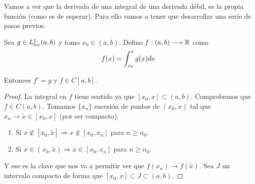 Vamos a ver que la derivada de una integral de una derivada débil, es la propia función (como es de esperar). Para ello vamos a tener que desarrollar una serie de pasos previos.

\begin{prop}
Sea $g\in L^1_{loc}(a,b)$ y tomo $x_0\in(a,b)$. Defino $f : (a,b) \longrightarrow \mathbb{R}$ como
\[
f(x)=\displaystyle\int_{ x_0 }^{ x } g(x)ds
\]

Entonces $f'=g$ y $f\in C[a,b]$.
\end{prop}

\begin{proof}

La integral en $f$ tiene sentido ya que $[x_0,x]\subset (a,b)$. Comprobemos que $f\in C(a,b)$. Tomamos $\{x_n\}$ sucesión de puntos de $(x_0,x)$ tal que $x_n\to \tilde{x}\in[x_0,x]$ (por ser compacto).

\begin{center}

\end{center}

\begin{enumerate}[-]
\item Si $x\notin[x_0,\tilde{x}] \Rightarrow x\notin [x_0,x_n]$ para $n\geq n_0$.
\item Si $x\in(x_0,\tilde{x}) \Rightarrow x\in [x_0,x_n]$ para $n\geq n_0$.
\end{enumerate}

Y ese es la clave que nos va a permitir ver que $f(x_n)\to f(\tilde{x})$. Sea $J$ un intervalo compacto de forma que $[x_0,x]\subset J\subset(a,b)$.


\end{proof}

